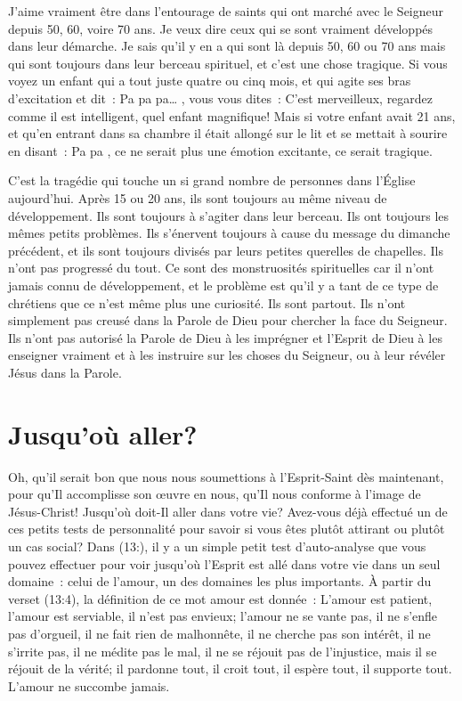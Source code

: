 J'aime vraiment être dans l'entourage de saints
 qui ont marché avec le Seigneur depuis 50, 60, voire 70 ans.
 Je veux dire ceux qui se sont vraiment développés dans leur démarche.
 Je sais qu'il y en a qui sont là depuis 50, 60 ou 70 ans mais qui sont
 toujours dans leur berceau spirituel, et c'est une chose tragique.
 Si vous voyez un enfant qui a tout juste quatre ou cinq mois,
 et qui agite ses bras d'excitation et dit~:
 \og Pa pa pa\dots{} \fg{}, vous vous dites~:
 \og C'est merveilleux, regardez comme il est intelligent,
 quel enfant magnifique! \fg{} 
 Mais si votre enfant avait 21 ans, et qu'en entrant dans sa chambre
 il était allongé sur le lit et se mettait à sourire en disant~:
 \og Pa pa \fg{}, ce ne serait plus une émotion excitante,
 ce serait tragique.

C'est la tragédie qui touche un si grand nombre de personnes
 dans l'Église aujourd'hui. Après 15 ou 20 ans,
 ils sont toujours au même niveau de développement.
 Ils sont toujours à s'agiter dans leur berceau.
 Ils ont toujours les mêmes petits problèmes.
 Ils s'énervent toujours à cause du message du dimanche précédent,
 et ils sont toujours divisés par leurs petites querelles de chapelles.
 Ils n'ont pas progressé du tout. Ce sont des monstruosités spirituelles
 car il n'ont jamais connu de développement, et le problème est qu'il y a
 tant de ce type de chrétiens que ce n'est même plus une curiosité.
 Ils sont partout. Ils n'ont simplement pas creusé dans la Parole de Dieu
 pour chercher la face du Seigneur. Ils n'ont pas autorisé la Parole de Dieu
 à les imprégner et l'Esprit de Dieu à les enseigner vraiment et
 à les instruire sur les choses du Seigneur,
 ou à leur révéler Jésus dans la Parole.


\section*{Jusqu'où aller?}

Oh, qu'il serait bon que nous nous soumettions à l'Esprit-Saint
 dès maintenant, pour qu'Il accomplisse son œuvre en nous,
 qu'Il nous conforme à l'image de Jésus-Christ!
 Jusqu'où doit-Il aller dans votre vie?
 Avez-vous déjà effectué un de ces petits tests de personnalité pour savoir
 si vous êtes plutôt attirant ou plutôt un cas social?
 Dans (13:), il y a un simple petit test d'auto-analyse
 que vous pouvez effectuer pour voir jusqu'où l'Esprit est allé
 dans votre vie dans un seul domaine~: celui de l'amour,
 un des domaines les plus importants.
 À partir du verset (13:4), la définition
 de ce mot \og amour \fg{} est donnée~:
 \og L'amour est patient, l'amour est serviable, il n'est pas envieux;
 l'amour ne se vante pas, il ne s'enfle pas d'orgueil,
 il ne fait rien de malhonnête, il ne cherche pas son intérêt,
 il ne s'irrite pas, il ne médite pas le mal, il ne se réjouit pas
 de l'injustice, mais il se réjouit de la vérité; il pardonne tout,
 il croit tout, il espère tout, il supporte tout.
 L'amour ne succombe jamais. \fg{}


